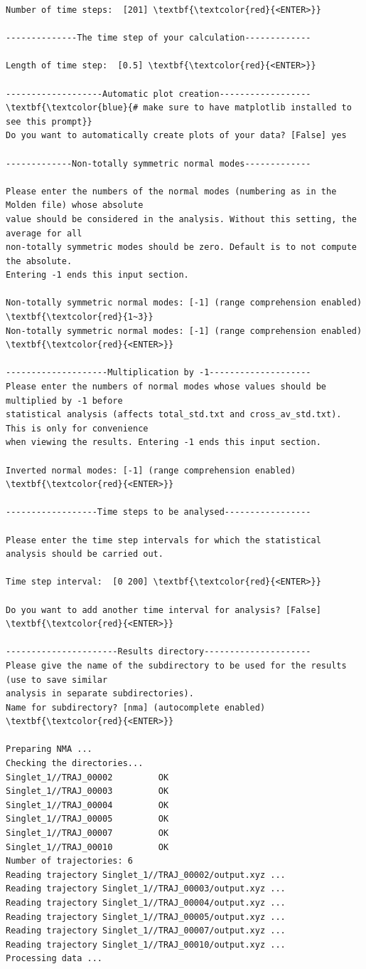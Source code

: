\documentclass[a4paper,11pt,DIV=15,openany]{scrbook}
\begin{document}
\begin{oframed}
\begin{Verbatim}[commandchars=\\\{\}]
Number of time steps:  [201] \textbf{\textcolor{red}{<ENTER>}}

--------------The time step of your calculation-------------

Length of time step:  [0.5] \textbf{\textcolor{red}{<ENTER>}}

-------------------Automatic plot creation------------------
\textbf{\textcolor{blue}{# make sure to have matplotlib installed to see this prompt}}
Do you want to automatically create plots of your data? [False] yes 

-------------Non-totally symmetric normal modes-------------

Please enter the numbers of the normal modes (numbering as in the Molden file) whose absolute 
value should be considered in the analysis. Without this setting, the average for all 
non-totally symmetric modes should be zero. Default is to not compute the absolute. 
Entering -1 ends this input section.

Non-totally symmetric normal modes: [-1] (range comprehension enabled) \textbf{\textcolor{red}{1~3}}
Non-totally symmetric normal modes: [-1] (range comprehension enabled) \textbf{\textcolor{red}{<ENTER>}}

--------------------Multiplication by -1--------------------
Please enter the numbers of normal modes whose values should be multiplied by -1 before 
statistical analysis (affects total_std.txt and cross_av_std.txt). This is only for convenience
when viewing the results. Entering -1 ends this input section.

Inverted normal modes: [-1] (range comprehension enabled) \textbf{\textcolor{red}{<ENTER>}}

------------------Time steps to be analysed-----------------

Please enter the time step intervals for which the statistical analysis should be carried out. 

Time step interval:  [0 200] \textbf{\textcolor{red}{<ENTER>}}

Do you want to add another time interval for analysis? [False] \textbf{\textcolor{red}{<ENTER>}}

----------------------Results directory---------------------
Please give the name of the subdirectory to be used for the results (use to save similar 
analysis in separate subdirectories).
Name for subdirectory? [nma] (autocomplete enabled) \textbf{\textcolor{red}{<ENTER>}}

Preparing NMA ...
Checking the directories...
Singlet_1//TRAJ_00002         OK
Singlet_1//TRAJ_00003         OK
Singlet_1//TRAJ_00004         OK
Singlet_1//TRAJ_00005         OK
Singlet_1//TRAJ_00007         OK
Singlet_1//TRAJ_00010         OK
Number of trajectories: 6
Reading trajectory Singlet_1//TRAJ_00002/output.xyz ...
Reading trajectory Singlet_1//TRAJ_00003/output.xyz ...
Reading trajectory Singlet_1//TRAJ_00004/output.xyz ...
Reading trajectory Singlet_1//TRAJ_00005/output.xyz ...
Reading trajectory Singlet_1//TRAJ_00007/output.xyz ...
Reading trajectory Singlet_1//TRAJ_00010/output.xyz ...
Processing data ...
\end{Verbatim}
\end{oframed}
\end{document}
